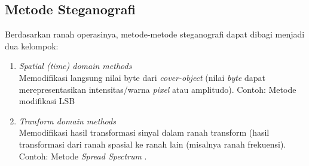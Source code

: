 	\subsection{Metode Steganografi}
	Berdasarkan ranah operasinya, metode-metode steganografi dapat dibagi menjadi dua kelompok:
	\begin{enumerate}
		\item \emph{Spatial (time) domain methods}\\
		Memodifikasi langsung nilai byte dari \emph{cover-object} (nilai \emph{byte} dapat merepresentasikan intensitas/warna \emph{pixel} atau amplitudo). Contoh: Metode modifikasi LSB
		
		\item \emph{Tranform domain methods}\\
		Memodifikasi hasil transformasi sinyal dalam ranah transform (hasil transformasi dari ranah spasial ke ranah lain (misalnya ranah frekuensi). Contoh: Metode \emph{Spread Spectrum} \cite{munir}.
		
	\end{enumerate}

